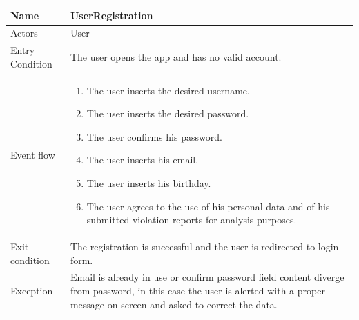 \vskip 0.2in
\begin{tabular}{|p{3.7cm}|p{11cm}|}
\hline
Name & UserRegistration\\
\hline
Actors & User\\
\hline
Entry Condition & The user opens the app and has no valid account.\\
\hline
Event flow & \begin{enumerate}
                \item The user inserts the desired username.
                \item The user inserts the desired password.
                \item The user confirms his password.
                \item The user inserts his email.
                \item The user inserts his birthday.
                \item The user agrees to the use of his personal data and of his submitted violation reports for analysis purposes.
            \end{enumerate}\\
\hline
Exit condition & The registration is successful and the user is redirected to login form.\\
\hline
Exception & Email is already in use or confirm password field content diverge from password, in this case the user is alerted with a proper message on screen and asked to correct the data.\\
\hline
\end{tabular}